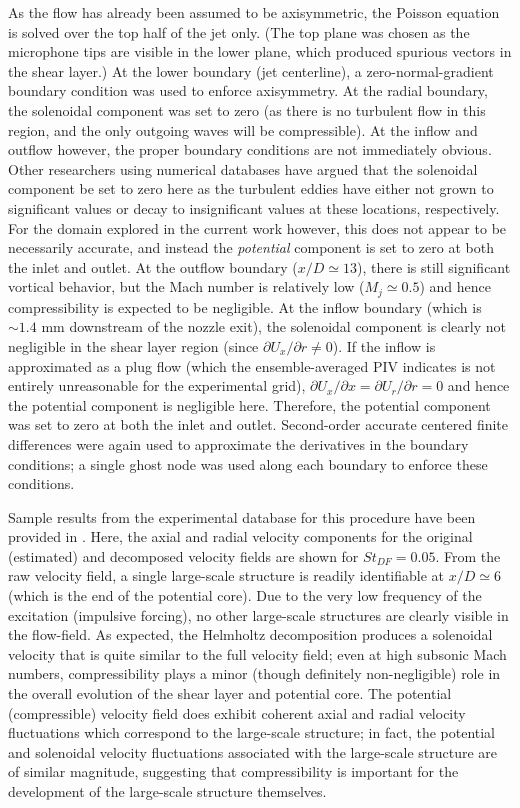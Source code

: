 As the flow has already been assumed to be axisymmetric, the Poisson equation is solved over the top half of the jet only.
(The top plane was chosen as the microphone tips are visible in the lower plane, which produced spurious vectors in the shear layer.)
At the lower boundary (jet centerline), a zero-normal-gradient boundary condition was used to enforce axisymmetry.
At the radial boundary, the solenoidal component was set to zero (as there is no turbulent flow in this region, and the only outgoing waves will be compressible).
At the inflow and outflow however, the proper boundary conditions are not immediately obvious.
Other researchers using numerical databases \citep{Unnikrishnan2015} have argued that the solenoidal component be set to zero here as the turbulent eddies have either not grown to significant values or decay to insignificant values at these locations, respectively.
For the domain explored in the current work however, this does not appear to be necessarily accurate, and instead the \textit{potential} component is set to zero at both the inlet and outlet.
At the outflow boundary ($x/D \simeq 13$), there is still significant vortical behavior, but the Mach number is relatively low ($M_j \simeq 0.5$) and hence compressibility is expected to be negligible.
At the inflow boundary (which is $\sim1.4$ mm downstream of the nozzle exit), the solenoidal component is clearly not negligible in the shear layer region (since $\partial U_x / \partial r \neq 0$).
If the inflow is approximated as a plug flow (which the ensemble-averaged PIV indicates is not entirely unreasonable for the experimental grid), $\partial U_x / \partial x = \partial U_r / \partial r = 0$ and hence the potential component is negligible here.
Therefore, the potential component was set to zero at both the inlet and outlet.
Second-order accurate centered finite differences were again used to approximate the derivatives in the boundary conditions; a single ghost node was used along each boundary to enforce these conditions.

Sample results from the experimental database for this procedure have been provided in .
Here, the axial and radial velocity components for the original (estimated) and decomposed velocity fields are shown for $St_{DF}=0.05$.
From the raw velocity field, a single large-scale structure is readily identifiable at $x/D \simeq 6$ (which is the end of the potential core).
Due to the very low frequency of the excitation (impulsive forcing), no other large-scale structures are clearly visible in the flow-field.
As expected, the Helmholtz decomposition produces a solenoidal velocity that is quite similar to the full velocity field; even at high subsonic Mach numbers, compressibility plays a minor (though definitely non-negligible) role in the overall evolution of the shear layer and potential core.
The potential (compressible) velocity field does exhibit coherent axial and radial velocity fluctuations which correspond to the large-scale structure; in fact, the potential and solenoidal velocity fluctuations associated with the large-scale structure are of similar magnitude, suggesting that compressibility is important for the development of the large-scale structure themselves.

